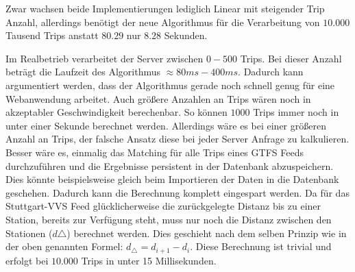   Zwar wachsen beide Implementierungen lediglich Linear mit steigender Trip Anzahl, allerdings benötigt der neue Algorithmus für die Verarbeitung von $10.000$ Tausend Trips anstatt $80.29$ nur $8.28$ Sekunden.  

  Im Realbetrieb verarbeitet der Server zwischen $0 - 500$ Trips. Bei dieser Anzahl beträgt die Laufzeit des Algorithmus $\approx80ms - 400ms$. Dadurch kann argumentiert werden, dass der Algorithmus gerade noch schnell genug für eine Webanwendung arbeitet. Auch größere Anzahlen an Trips wären noch in akzeptabler Geschwindigkeit berechenbar. So können $1000$ Trips immer noch in unter einer Sekunde berechnet werden. Allerdings wäre es bei einer größeren Anzahl an Trips, der falsche Ansatz diese bei jeder Server Anfrage zu kalkulieren. Besser wäre es, einmalig das Matching für alle Trips eines GTFS Feeds durchzuführen und die Ergebnisse persistent in der Datenbank abzuspeichern. Dies könnte beispielsweise gleich beim Importieren der Daten in die Datenbank geschehen. Dadurch kann die Berechnung komplett eingespart werden. Da für das Stuttgart-VVS Feed glücklicherweise die zurückgelegte Distanz bis zu einer Station, bereits zur Verfügung steht, muss nur noch die Distanz zwischen den Stationen ($d\triangle$) berechnet werden. Dies geschieht nach dem selben Prinzip wie in der oben genannten Formel: $ d_\triangle = d_{i+1} - d_i$. Diese Berechnung ist trivial und erfolgt bei $10.000$ Trips in unter 15 Millisekunden.

  
